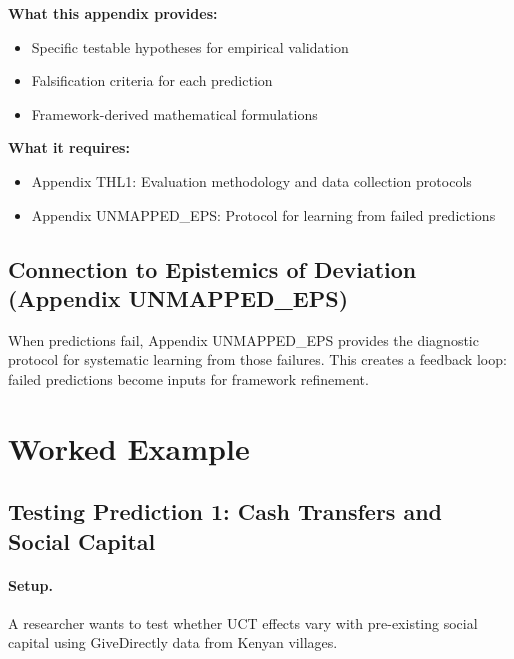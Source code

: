 \begin{tcolorbox}[colback=yellow!5!white, colframe=yellow!75!black,
    title=Integration: Appendix UNMAPPED_SUN $\leftrightarrow$ Appendix THL1]
\textbf{What this appendix provides:}
\begin{itemize}[nosep]
\item Specific testable hypotheses for empirical validation
\item Falsification criteria for each prediction
\item Framework-derived mathematical formulations
\end{itemize}

\textbf{What it requires:}
\begin{itemize}[nosep]
\item Appendix THL1: Evaluation methodology and data collection protocols
\item Appendix UNMAPPED_EPS: Protocol for learning from failed predictions
\end{itemize}
\end{tcolorbox}

\subsection{Connection to Epistemics of Deviation (Appendix UNMAPPED_EPS)}

When predictions fail, Appendix UNMAPPED_EPS provides the diagnostic protocol for systematic learning from those failures. This creates a feedback loop: failed predictions become inputs for framework refinement.



\section{Worked Example}
\label{sec:S-example}

\subsection{Testing Prediction 1: Cash Transfers and Social Capital}

\paragraph{Setup.}
A researcher wants to test whether UCT effects vary with pre-existing social capital using GiveDirectly data from Kenyan villages.

